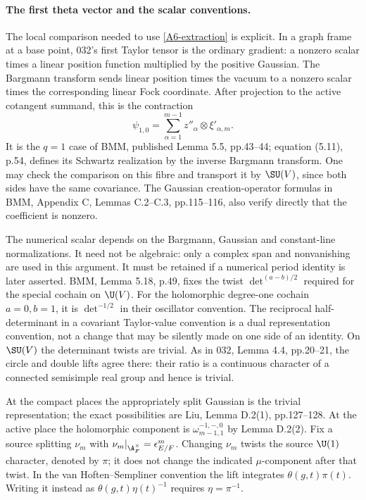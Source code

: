 \documentclass[11pt]{article}
\theoremstyle{definition}\newtheorem{definition}[theorem]{Definition}\newtheorem{remark}[theorem]{Remark}
\begin{document}
\paragraph{The first theta vector and the scalar conventions.}
The local comparison needed to use \eqref{A6-extraction} is explicit.
In a graph frame at a base point, 032's first Taylor tensor is the
ordinary gradient: a nonzero scalar times a linear position function
multiplied by the positive Gaussian. The Bargmann transform sends
linear position times the vacuum to a nonzero scalar times the
corresponding linear Fock coordinate. After projection to the active
cotangent summand, this is the contraction
\[
 \psi_{1,0}=\sum_{\alpha=1}^{m-1}
                 z''_\alpha\otimes\xi'_{\alpha,m}.
\]
It is the $q=1$ case of BMM, published Lemma 5.5, pp.43--44;
equation (5.11), p.54, defines its Schwartz realization by the
inverse Bargmann transform. One may check the comparison on this
fibre and transport it by $\SU(V)$, since both sides have the same
covariance. The Gaussian creation-operator formulas in BMM,
Appendix C, Lemmas C.2--C.3, pp.115--116, also verify directly that
the coefficient is nonzero.

The numerical scalar depends on the Bargmann, Gaussian and
constant-line normalizations. It need not be algebraic: only a
complex span and nonvanishing are used in this argument. It must be
retained if a numerical period identity is later asserted.
BMM, Lemma 5.18, p.49, fixes the twist
$\det^{(a-b)/2}$ required for the special cochain on $\U(V)$.
For the holomorphic degree-one cochain $a=0,b=1$, it is
$\det^{-1/2}$ in their oscillator convention. The reciprocal
half-determinant in a covariant Taylor-value convention is a dual
representation convention, not a change that may be silently made
on one side of an identity. On $\SU(V)$ the determinant twists
are trivial. As in 032, Lemma 4.4, pp.20--21, the circle and double
lifts agree there: their ratio is a continuous character of a
connected semisimple real group and hence is trivial.

At the compact places the appropriately split Gaussian is the
trivial representation; the exact possibilities are Liu,
Lemma D.2(1), pp.127--128. At the active place the holomorphic
component is $\omega_{m-1,1}^{-1,-,0}$ by Lemma D.2(2).
Fix a source splitting $\nu_m$ with
$\nu_m|_{\A_F^\times}=\epsilon_{E/F}^m$. Changing $\nu_m$
twists the source $\U(1)$ character, denoted by $\pi$; it does not
change the indicated $\mu$-component after that twist. In the
van Hoften--Sempliner convention the lift integrates
$\theta(g,t)\pi(t)$. Writing it instead as
$\theta(g,t)\eta(t)^{-1}$ requires $\eta=\pi^{-1}$.
\end{document}
